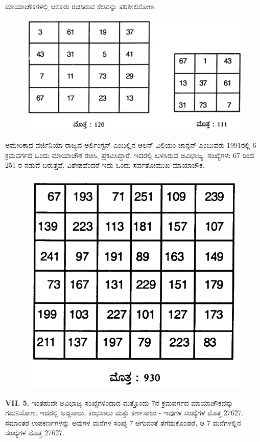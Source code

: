 ಮಾಯಾಚೌಕಗಳಲ್ಲಿ ಆಸಕ್ತರು ರಚಿಸಿರುವ ಕೆಲವನ್ನು ಪರಿಶೀಲಿಸೋಣ.
\begin{figure}[H]
\includegraphics{src/figures/chap5/fig5-4.jpg}
\end{figure}

ಅಮೇರಿಕಾದ ವರ್ಜಿನಿಯಾ ರಾಜ್ಯದ ಅರ್ಲಿಂಗ್ಟನ್ ಎಂಬಲ್ಲಿನ ಆಲನ್ ವಿಲಿಯಂ ಜಾನ್ಸನ್ ಎಂಬುವರು 1991ರಲ್ಲಿ 6 ಕ್ರಮವರ್ಗದ ಒಂದು ಮಾಯಾಚೌಕ ರಚಿಸಿ, ಪ್ರಕಟಸಿದ್ದಾರೆ. ಇದರಲ್ಲಿ ಬಳಸಿರುವ ಅವಿಭಾಜ್ಯ. ಸಂಖ್ಯೆಗಳು 67 ರಿಂದ 251 ರ ನಡುವೆ ಬರುತ್ತವೆ. ವಿಶೇಷವೆಂದರೆ ಇದು ಒಂದು ಸರ್ವತೋಮುಖ ಮಾಯಾಚೌಕ.
\begin{figure}[H]
\includegraphics{src/figures/chap5/fig5-5.jpg}
\end{figure}

\textbf{VII. 5.} ಇಂತಹುದೇ ಅವಿಭಾಜ್ಯ ಸಂಖ್ಯೆಗಳಿಂದಾದ ಮತ್ತೊಂದು 7ನೆ ಕ್ರಮವರ್ಗದ ಮಾಯಾಚೌಕವನ್ನು ಗಮನಿಸೋಣ. ಇದರಲ್ಲಿ ಅಡ್ಡಸಾಲು, ಕಂಭಸಾಲು ಮತ್ತು ಕರ್ಣಸಾಲು - ಇವುಗಳ ಸಂಖ್ಯೆಗಳ ಮೊತ್ತ 27627. ಸಮಾಂತರ ಉಪಕರ್ಣಗಳನ್ನು ಅವುಗಳ ಮನೆಗಳ ಸಂಖ್ಯೆ 7 ಆಗುವಂತೆ ತೆಗೆದುಕೊಂಡರೆ, ಆ 7 ಮನೆಗಳಲ್ಲಿನ ಸಂಖ್ಯೆಗಳ ಮೊತ್ತ 27627.

